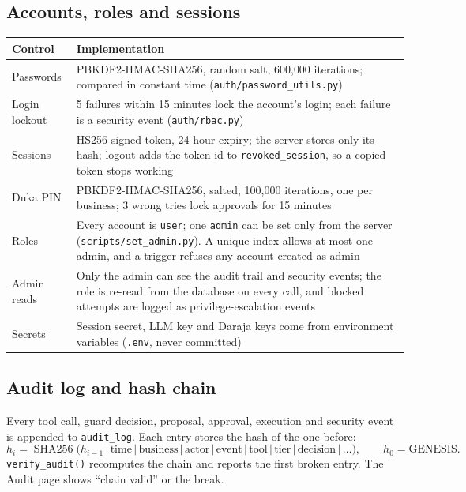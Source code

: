 \documentclass[10pt,a4paper]{article}
\newcommand{\code}[1]{\texttt{\small #1}}
\begin{document}
\subsection{Accounts, roles and sessions}
\begin{center}
\begin{tabularx}{\textwidth}{@{}L{3.2cm}Y@{}}
\toprule
\textbf{Control} & \textbf{Implementation}\\
\midrule
Passwords & PBKDF2-HMAC-SHA256, random salt, 600{,}000 iterations; compared in constant time (\code{auth/password\_utils.py})\\
Login lockout & 5 failures within 15 minutes lock the account's login; each failure is a security event (\code{auth/rbac.py})\\
Sessions & HS256-signed token, 24-hour expiry; the server stores only its hash; logout adds the token id to \code{revoked\_session}, so a copied token stops working\\
Duka PIN & PBKDF2-HMAC-SHA256, salted, 100{,}000 iterations, one per business; 3 wrong tries lock approvals for 15 minutes\\
Roles & Every account is \code{user}; one \code{admin} can be set only from the server (\code{scripts/set\_admin.py}). A unique index allows at most one admin, and a trigger refuses any account created as admin\\
Admin reads & Only the admin can see the audit trail and security events; the role is re-read from the database on every call, and blocked attempts are logged as privilege-escalation events\\
Secrets & Session secret, LLM key and Daraja keys come from environment variables (\code{.env}, never committed)\\
\bottomrule
\end{tabularx}
\end{center}

\subsection{Audit log and hash chain}
Every tool call, guard decision, proposal, approval, execution and security event is appended to \code{audit\_log}. Each entry stores the hash of the one before:
\[
h_i=\operatorname{SHA256}\bigl(h_{i-1}\,|\,\text{time}\,|\,\text{business}\,|\,\text{actor}\,|\,\text{event}\,|\,\text{tool}\,|\,\text{tier}\,|\,\text{decision}\,|\,\ldots\bigr),\qquad h_0=\text{GENESIS}.
\]
\code{verify\_audit()} recomputes the chain and reports the first broken entry. The Audit page shows ``chain valid'' or the break.
\end{document}

